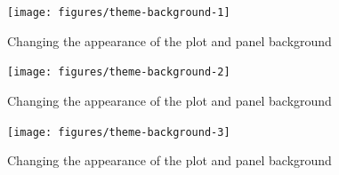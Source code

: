 \begin{Shaded}
\begin{Highlighting}[]
\StringTok{ }\NormalTok{(} \NormalTok{(} \NormalTok{, } \NormalTok{))}
\end{Highlighting}
\end{Shaded}

\begin{figure}
\texttt{[image: figures/theme-background-1]} \caption{Changing the appearance of the plot and panel background\label{fig:theme-background1}}
\end{figure}

\begin{Shaded}
\begin{Highlighting}[]
\StringTok{ }\NormalTok{(} \NormalTok{(} \NormalTok{))}
\end{Highlighting}
\end{Shaded}

\begin{figure}
\texttt{[image: figures/theme-background-2]} \caption{Changing the appearance of the plot and panel background\label{fig:theme-background2}}
\end{figure}

\begin{Shaded}
\begin{Highlighting}[]
\StringTok{ }\NormalTok{(} \NormalTok{(} \NormalTok{))}
\end{Highlighting}
\end{Shaded}

\begin{figure}
\texttt{[image: figures/theme-background-3]} \caption{Changing the appearance of the plot and panel background\label{fig:theme-background3}}
\end{figure}

\begin{Shaded}
\begin{Highlighting}[]
\StringTok{ }\NormalTok{(} \NormalTok{())}
\end{Highlighting}
\end{Shaded}


